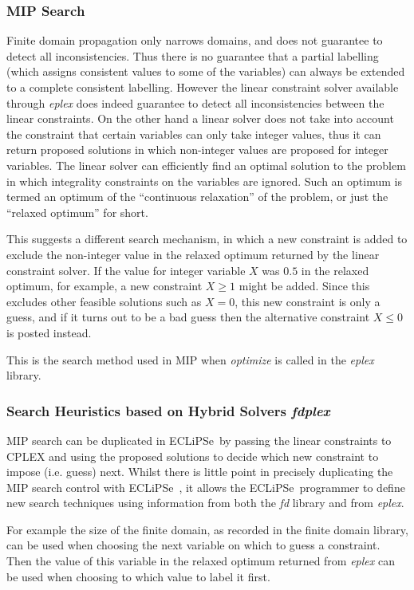 \documentclass[a4wide]{article}
\newcommand{\ECL}{\mbox{ECLiPSe\ }{\hspace{1mm}}}
\begin{document}
\subsubsection{MIP Search}
Finite domain propagation only narrows domains, and does not guarantee
to detect all inconsistencies.
Thus there is no
guarantee that a partial labelling (which assigns consistent values to
some of the variables) can always be extended to a complete
consistent labelling.
However the linear constraint solver available through {\em eplex}
does indeed guarantee to 
detect all inconsistencies between the linear constraints.
On the other hand a linear solver does not take into account the
constraint that certain variables can only take integer values, thus
it can return proposed solutions in which non-integer values are
proposed for integer variables.
The linear solver can efficiently find an optimal solution to the
problem in which integrality constraints on the variables are ignored.
Such an optimum is termed an optimum of the ``continuous relaxation''
of the problem, or just the ``relaxed optimum'' for short.
  
This suggests a different search mechanism, in which a new constraint
is added to exclude the non-integer value in the relaxed optimum 
returned by the linear constraint solver.
If the value for integer variable $X$ was $0.5$ in the relaxed
optimum, for example,
a new constraint $X \geq 1$ might be added.
Since this excludes other feasible solutions such as $X=0$, this new
constraint is only a guess, and if it turns out to be a bad guess then
the alternative constraint $X \leq 0$ is posted instead.

This is the search method used in MIP when {\em optimize} is called in
the {\em eplex} library.

\subsubsection{Search Heuristics based on Hybrid Solvers {\em fdplex}}
MIP search can be duplicated in \ECL by
passing the linear constraints to CPLEX and using the proposed
solutions to decide which new constraint to impose (i.e. guess) next.
Whilst there is little point in precisely duplicating the MIP search
control with \ECL, it allows the \ECL programmer to define new search
techniques using information from both the {\em fd} library and from
{\em eplex}.

For example the size of the finite domain, as recorded in the
finite domain library, can be used when choosing the next variable on
which to guess a constraint.
Then the value of this variable in the relaxed optimum returned from
{\em eplex} can be used when choosing to which value to label it
first. 
\end{document}
